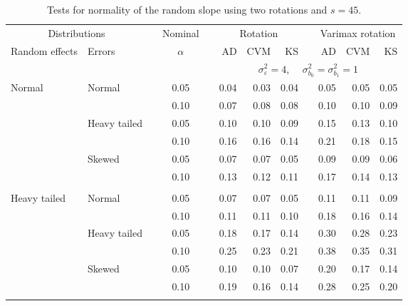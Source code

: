 \begin{table}[ht]
\caption{\label{tab:simb145}Tests for normality of the random slope using two rotations and $s = 45$.}
\begin{scriptsize}
\begin{center}
\begin{tabular}{ll p{.1cm} c p{.1cm} rrr p{.1cm} rrr}
  \hline
  \multicolumn{2}{c}{Distributions}& & Nominal & &  \multicolumn{3}{c}{Rotation} & & \multicolumn{3}{c}{Varimax rotation} \\ \cline{1-2} \cline{6-8} \cline{10-12}   
  Random effects & Errors & & $\alpha$ & & AD & CVM & KS & & AD & CVM & KS \\ 
   \hline
& && && \multicolumn{7}{c}{$\sigma_{\varepsilon}^2 = 4$, \ \ $\sigma_{b_0}^2 = \sigma_{b_1}^2 = 1$} \\ \cline{6-12}
\rowcolor{gray!20}Normal       & Normal       && 0.05 &&  0.04 & 0.03 & 0.04 && 0.05 & 0.05 & 0.05 \\ 
\rowcolor{gray!20}             &              && 0.10 &&  0.07 & 0.08 & 0.08 && 0.10 & 0.10 & 0.09 \\ 
\rowcolor{gray!20}             & Heavy tailed && 0.05 &&  0.10 & 0.10 & 0.09 && 0.15 & 0.13 & 0.10 \\ 
\rowcolor{gray!20}             &              && 0.10 &&  0.16 & 0.16 & 0.14 && 0.21 & 0.18 & 0.15 \\ 
\rowcolor{gray!20}             & Skewed       && 0.05 &&  0.07 & 0.07 & 0.05 && 0.09 & 0.09 & 0.06 \\ 
\rowcolor{gray!20}             &              && 0.10 &&  0.13 & 0.12 & 0.11 && 0.17 & 0.14 & 0.13 \\ 
             &&&&&&&&&&&\\
Heavy tailed & Normal       && 0.05 &&  0.07 & 0.07 & 0.05 && 0.11 & 0.11 & 0.09 \\ 
             &              && 0.10 &&  0.11 & 0.11 & 0.10 && 0.18 & 0.16 & 0.14 \\ 
             & Heavy tailed && 0.05 &&  0.18 & 0.17 & 0.14 && 0.30 & 0.28 & 0.23 \\ 
             &              && 0.10 &&  0.25 & 0.23 & 0.21 && 0.38 & 0.35 & 0.31 \\ 
             & Skewed       && 0.05 &&  0.10 & 0.10 & 0.07 && 0.20 & 0.17 & 0.14 \\ 
             &              && 0.10 &&  0.19 & 0.16 & 0.14 && 0.28 & 0.25 & 0.20 \\ 
             &&&&&&&&&&&\\

\end{tabular}
\end{center}
\end{scriptsize}
\end{table}
